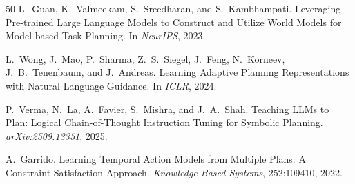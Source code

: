 \documentclass{article}
\begin{document}
\begin{thebibliography}{50}
L.~Guan, K.~Valmeekam, S.~Sreedharan, and S.~Kambhampati.
\newblock Leveraging Pre-trained Large Language Models to Construct and Utilize World Models for Model-based Task Planning.
\newblock In \emph{NeurIPS}, 2023.

L.~Wong, J.~Mao, P.~Sharma, Z.~S.~Siegel, J.~Feng, N.~Korneev, J.~B.~Tenenbaum, and J.~Andreas.
\newblock Learning Adaptive Planning Representations with Natural Language Guidance.
\newblock In \emph{ICLR}, 2024.

P.~Verma, N.~La, A.~Favier, S.~Mishra, and J.~A.~Shah.
\newblock Teaching LLMs to Plan: Logical Chain-of-Thought Instruction Tuning for Symbolic Planning.
\newblock \emph{arXiv:2509.13351}, 2025.

A.~Garrido.
\newblock Learning Temporal Action Models from Multiple Plans: A Constraint Satisfaction Approach.
\newblock \emph{Knowledge-Based Systems}, 252:109410, 2022.

\end{thebibliography}
\end{document}
